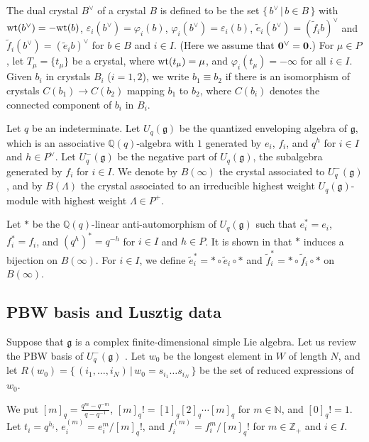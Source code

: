 \documentclass[leqno,11pt]{amsart}
\numberwithin{equation}{section}
\newcommand{\N}{\mathbb{N}}
\newcommand{\Z}{\mathbb{Z}}
\newcommand{\te}{\widetilde{e}}
\newcommand{\tf}{\widetilde{f}}
\newcommand{\g}{\mathfrak{g}}
\begin{document}
The dual crystal $B^\vee$ of a crystal $B$ is defined
to be the set $\{\,b^\vee\,|\,b\in B\,\}$ with ${\rm
wt}(b^\vee)=-{\rm wt}(b)$, $\varepsilon_i(b^\vee)=\varphi_i(b)$,
$\varphi_i(b^\vee)=\varepsilon_i(b)$, $\te_i(b^\vee)=(\tf_i b)^\vee$ and $\tf_i(b^\vee)=\left(\te_i b \right)^\vee$ for
$b\in B$ and $i\in I$. (Here we assume that ${\bf 0}^\vee={\bf 0}$.)
For $\mu\in P$, let $T_\mu=\{t_\mu\}$ be a crystal, where ${\rm wt}(t_\mu)=\mu$, and $\varphi_i(t_\mu)=-\infty$ for all $i\in I$.
Given $b_i $ in crystals $B_i $ ($i=1,2$), we write $b_1 \equiv b_2$ if there is an isomorphism of crystals $C(b_1) \rightarrow C(b_2)$ mapping $b_1$ to $b_2$, where $C(b_i)$ denotes the connected component of $b_i$ in $B_i$.


Let $q$ be an indeterminate. Let $U_q(\g)$ be the quantized enveloping algebra of $\g$, which is an associative $\mathbb{Q}(q)$-algebra with $1$ generated by $e_i$, $f_i$, and $q^h$ for $i\in I$ and $h\in P^\vee$. 
Let $U^-_q(\g)$ be the negative part of $U_q(\g)$, the subalgebra generated by $f_i$ for $i\in I$. We denote by $B(\infty)$ the crystal associated to $U^-_q(\g)$, and by $B(\Lambda)$ the crystal associated to an irreducible highest weight $U_q(\g)$-module with highest weight
$\Lambda\in P^+$.

Let $\ast$ be the $\mathbb{Q}(q)$-linear anti-automorphism of $U_q(\g)$ such that 
$e_i^\ast =e_i$, $f_i^\ast=f_i$, and $(q^h)^\ast =q^{-h}$ for $i\in I$ and $h\in P$. It is shown in \cite{Kas91,Kas93} that $\ast$ induces a bijection on $B(\infty)$. For $i\in I$, we define $\te_i^\ast =\ast \circ \te_i \circ \ast$ and $\tf_i^\ast =\ast \circ \tf_i \circ \ast$ on $B(\infty)$.


\subsection{PBW basis and Lusztig data}\label{sec:PBW crystal}
Suppose that $\g$ is a complex finite-dimensional simple Lie algebra.  
Let us review the PBW basis of $U^-_q(\g)$ \cite{Lu90,Lu90-2,S94}.
Let $w_0$ be the longest element in $W$ of length $N$, and let $R(w_0)=\{\,(i_1,\ldots,i_N)\,|\,w_0=s_{i_1}\ldots s_{i_N}\,\}$ be the set of reduced expressions of $w_0$.



We put  $[m]_q=\frac{q^m-q^{-m}}{q-q^{-1}}$, $[m]_q!=[1]_q[2]_q\cdots [m]_q$ for $m\in\N$, and $[0]_q!=1$. Let $t_i=q^{h_i}$, $e_i^{(m)}=e_i^m/[m]_q!$, and $f_i^{(m)}=f_i^m/[m]_q!$  for $m\in\Z_+$ and $i\in I$.
\end{document}
